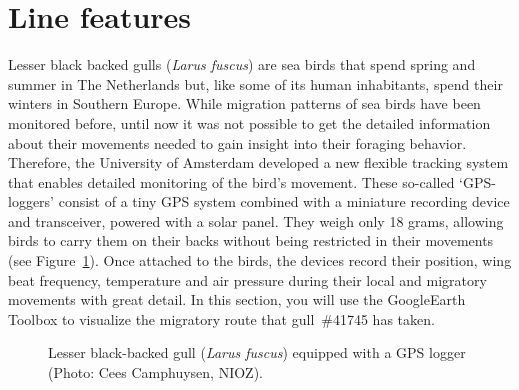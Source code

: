\section{Line features}
Lesser black backed gulls (\textit{Larus fuscus}) are sea birds that spend spring and summer in The Netherlands but, like some of its human inhabitants, spend their winters in Southern Europe. While migration patterns of sea birds have been monitored before, until now it was not possible to get the detailed information about their movements needed to gain insight into their foraging behavior. Therefore, the University of Amsterdam developed a new flexible tracking system that enables detailed monitoring of the bird's movement. These so-called `GPS-loggers' consist of a tiny GPS system combined with a miniature recording device and transceiver, powered with a solar panel. They weigh only 18 grams, allowing birds to carry them on their backs without being restricted in their movements (see Figure~\ref{fig:lesser-black-backed-gull}). Once attached to the birds, the devices record their position, wing beat frequency, temperature and air pressure during their local and migratory movements with great detail.
In this section, you will use the GoogleEarth Toolbox to visualize the migratory route that gull~\#41745 has taken.
\begin{figure}[!htbp]
  \centering
  \caption{Lesser black-backed gull (\textit{Larus fuscus}) equipped with a GPS logger (Photo: Cees Camphuysen, NIOZ).}\label{fig:lesser-black-backed-gull}
\end{figure}

